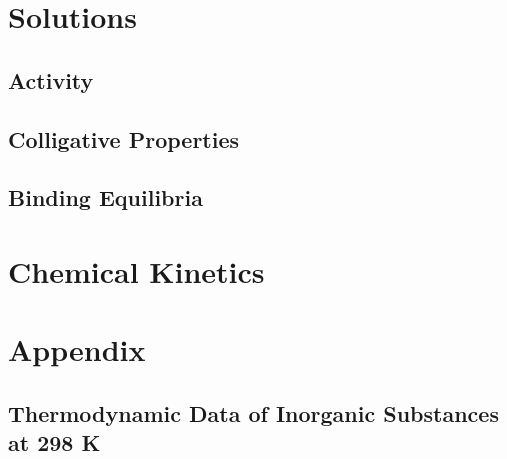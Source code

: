 \documentclass[
  9pt,
]{extbook}
\theoremstyle{definition}
\theoremstyle{definition}
\theoremstyle{definition}
\theoremstyle{remark}
\begin{document}
\hypertarget{Solutions}{%
\chapter{Solutions}\label{Solutions}}

\hypertarget{activity}{%
\section{Activity}\label{activity}}

\hypertarget{colligative-properties}{%
\section{Colligative Properties}\label{colligative-properties}}

\hypertarget{binding-equilibria}{%
\section{Binding Equilibria}\label{binding-equilibria}}

\hypertarget{Kinetics}{%
\chapter{Chemical Kinetics}\label{Kinetics}}

\renewcommand*{\standardstate}{{-\kern-6pt{\ominus}\kern-6pt-}}

\hypertarget{appendix}{%
\chapter{Appendix}\label{appendix}}

\hypertarget{thermodynamic-data-of-inorganic-substances-at-298-k}{%
\section{Thermodynamic Data of Inorganic Substances at 298 K}\label{thermodynamic-data-of-inorganic-substances-at-298-k}}

\tiny
\end{document}
